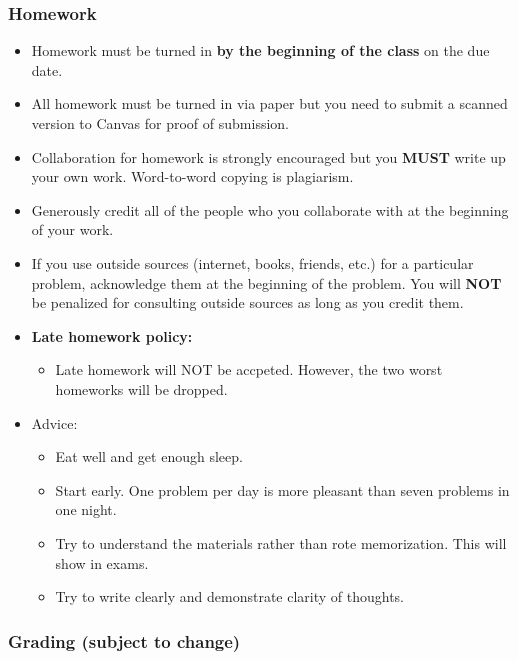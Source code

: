 \documentclass[
]{article}
\providecommand{\tightlist}{%
  \setlength{\itemsep}{0pt}\setlength{\parskip}{0pt}}
\begin{document}
\hypertarget{homework}{%
\subsubsection*{Homework}\label{homework}}

\begin{itemize}
\tightlist
\item
  Homework must be turned in \textbf{by the beginning of the class} on the due date.
\item
  All homework must be turned in via paper but you need to submit a scanned version to Canvas for proof of submission.
\item
  Collaboration for homework is strongly encouraged but you \textbf{MUST} write up your own work. Word-to-word copying is plagiarism.
\item
  Generously credit all of the people who you collaborate with at the beginning of your work.
\item
  If you use outside sources (internet, books, friends, etc.) for a particular problem, acknowledge them at the beginning of the problem.
  You will \textbf{NOT} be penalized for consulting outside sources as long as you credit them.
\item
  \textbf{Late homework policy:}

  \begin{itemize}
  \tightlist
  \item
    Late homework will NOT be accpeted. However, the two worst homeworks will be dropped.
  \end{itemize}
\item
  Advice:

  \begin{itemize}
  \tightlist
  \item
    Eat well and get enough sleep.
  \item
    Start early. One problem per day is more pleasant than seven problems in one night.
  \item
    Try to understand the materials rather than rote memorization. This will show in exams.
  \item
    Try to write clearly and demonstrate clarity of thoughts.
  \end{itemize}
\end{itemize}

\hypertarget{grading-subject-to-change}{%
\subsubsection*{Grading (subject to change)}\label{grading-subject-to-change}}
\end{document}
